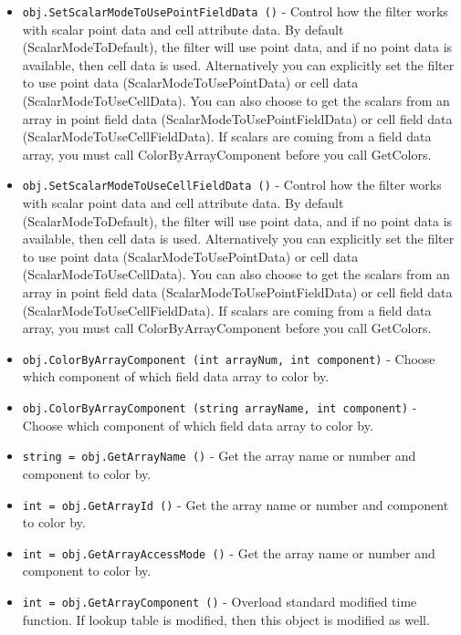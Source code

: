 \begin{itemize}
\item  \verb|obj.SetScalarModeToUsePointFieldData ()| -  Control how the filter works with scalar point data and cell attribute
 data.  By default (ScalarModeToDefault), the filter will use point data,
 and if no point data is available, then cell data is used. Alternatively
 you can explicitly set the filter to use point data
 (ScalarModeToUsePointData) or cell data (ScalarModeToUseCellData).
 You can also choose to get the scalars from an array in point field
 data (ScalarModeToUsePointFieldData) or cell field data
 (ScalarModeToUseCellFieldData).  If scalars are coming from a field
 data array, you must call ColorByArrayComponent before you call
 GetColors.

\item  \verb|obj.SetScalarModeToUseCellFieldData ()| -  Control how the filter works with scalar point data and cell attribute
 data.  By default (ScalarModeToDefault), the filter will use point data,
 and if no point data is available, then cell data is used. Alternatively
 you can explicitly set the filter to use point data
 (ScalarModeToUsePointData) or cell data (ScalarModeToUseCellData).
 You can also choose to get the scalars from an array in point field
 data (ScalarModeToUsePointFieldData) or cell field data
 (ScalarModeToUseCellFieldData).  If scalars are coming from a field
 data array, you must call ColorByArrayComponent before you call
 GetColors.

\item  \verb|obj.ColorByArrayComponent (int arrayNum, int component)| -  Choose which component of which field data array to color by.

\item  \verb|obj.ColorByArrayComponent (string arrayName, int component)| -  Choose which component of which field data array to color by.

\item  \verb|string = obj.GetArrayName ()| -  Get the array name or number and component to color by.

\item  \verb|int = obj.GetArrayId ()| -  Get the array name or number and component to color by.

\item  \verb|int = obj.GetArrayAccessMode ()| -  Get the array name or number and component to color by.

\item  \verb|int = obj.GetArrayComponent ()| -  Overload standard modified time function. If lookup table is modified,
 then this object is modified as well.


\end{itemize}
